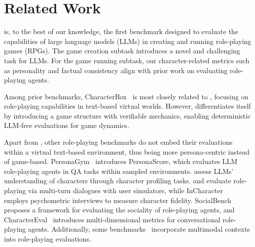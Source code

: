 \section{Related Work}
\benchmark{} is, to the best of our knowledge, the first benchmark designed to evaluate the capabilities of large language models (LLMs) in creating and running role-playing games (RPGs). The game creation subtask introduces a novel and challenging task for LLMs. For the game running subtask, our character-related metrics such as personality and factual consistency align with prior work on evaluating role-playing agents.

Among prior benchmarks, CharacterBox~\citep{wang2024characterbox} is most closely related to \benchmark{}, focusing on role-playing capabilities in text-based virtual worlds. However, \benchmark{} differentiates itself by introducing a game structure with verifiable mechanics, enabling deterministic LLM-free evaluations for game dynamics.

Apart from \cite{wang2024characterbox}, other role-playing benchmarks do not embed their evaluations within a virtual text-based environment, thus being more persona-centric instead of game-based. PersonaGym~\citep{samuel2024personagym} introduces PersonaScore, which evaluates LLM role-playing agents in QA tasks within sampled environments. \citet{yuan-etal-2024-evaluating} assess LLMs’ understanding of characters through character profiling tasks. \citet{rpbench} and \citet{gusev2024pingpong} evaluate role-playing via multi-turn dialogues with user simulators, while InCharacter~\citep{wang-etal-2024-incharacter} employs psychometric interviews to measure character fidelity. SocialBench~\citep{chen-etal-2024-socialbench} proposes a framework for evaluating the sociality of role-playing agents, and CharacterEval~\citep{tu-etal-2024-charactereval} introduces multi-dimensional metrics for conversational role-playing agents.
Additionally, some benchmarks~\cite{gusev2024pingpong,dai2024mmrole} incorporate multimodal contexts into role-playing evaluations.